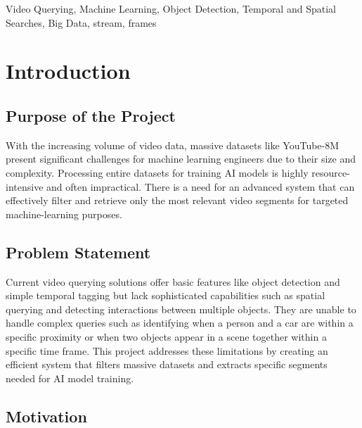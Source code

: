 \documentclass[conference]{IEEEtran}
\begin{document}
\begin{IEEEkeywords}
Video Querying, Machine Learning, Object Detection, Temporal and Spatial Searches, Big Data, stream, frames
\end{IEEEkeywords}


\section{Introduction}

\subsection{Purpose of the Project}

With the increasing volume of video data, massive datasets like YouTube-8M\cite{abu2016youtube} present significant challenges for machine learning engineers due to their size and complexity. Processing entire datasets for training AI models is highly resource-intensive and often impractical. There is a need for an advanced system that can effectively filter and retrieve only the most relevant video segments for targeted machine-learning purposes.

\subsection{Problem Statement}

Current video querying solutions offer basic features like object detection and simple temporal tagging but lack sophisticated capabilities such as spatial querying and detecting interactions between multiple objects. They are unable to handle complex queries such as identifying when a person and a car are within a specific proximity or when two objects appear in a scene together within a specific time frame. This project addresses these limitations by creating an efficient system that filters massive datasets and extracts specific segments needed for AI model training.

\subsection{Motivation}
\end{document}

